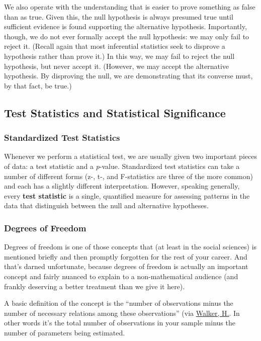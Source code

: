 We also operate with the understanding that is easier to prove something as false than as true. Given this, the null hypothesis is always presumed true until sufficient evidence is found supporting the alternative hypothesis. Importantly, though, we do not ever formally accept the null hypothesis: we may only fail to reject it. (Recall again that most inferential statistics seek to disprove a hypothesis rather than prove it.) In this way, we may fail to reject the null hypothesis, but never accept it. (However, we may accept the alternative hypothesis. By disproving the null, we are demonstrating that its converse must, by that fact, be true.)

\subsection{Test Statistics and Statistical Significance}

\subsubsection{Standardized Test Statistics}
Whenever we perform a statistical test, we are usually given two important pieces of data: a test statistic and a \textit{p}-value. Standardized test statistics can take a number of different forms (z-, t-, and F-statistics are three of the more common) and each has a slightly different interpretation. However, speaking generally, every \textbf{test statistic}  is a single, quantified measure for assessing patterns in the data that distinguish between the null and alternative hypotheses.

\subsubsection{Degrees of Freedom}

Degrees of freedom  is one of those concepts that (at least in the social sciences) is mentioned briefly and then promptly forgotten for the rest of your career. And that's darned unfortunate, because degrees of freedom is actually an important concept and fairly nuanced to explain to a non-mathematical audience (and frankly deserving a better treatment than we give it here).

A basic definition of the concept is the ``number of observations minus the number of necessary relations among these observations'' (via \href{http://dx.doi.org/10.1037%2Fh0054588}{Walker, H.}. In other words it's the total number of observations in your sample minus the number of parameters being estimated.

